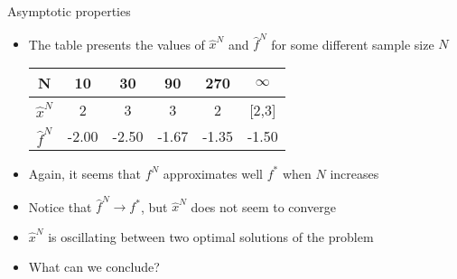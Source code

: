  
\begin{frame}{Asymptotic properties}

\begin{itemize}

\item The table presents the values of $\hat x^N$ and $\hat f^N$ for some different sample size $N$


\begin{center}
\begin{tabular}{|c|c|c|c|c|c|}
\hline 
N & 10 & 30 & 90 & 270 & $\infty$ \\ 
\hline 
$\hat x^N$ & 2 & 3 & 3 & 2 & [2,3] \\ 
\hline 
$\hat f^N$ & -2.00 & -2.50 & -1.67 & -1.35 & -1.50 \\ 
\hline 
\end{tabular} 
\end{center}

\item Again, it seems that  $f^N$ approximates well $f^*$ when $N$ increases
\pula

\item Notice that  $\hat f^N \to f^*$, but $\hat x^N$ does not seem to converge 
\pula
\item $\hat x^N$ is oscillating between two optimal solutions of the problem
\pula

\item What can we conclude?
\end{itemize}

 \end{frame} 

